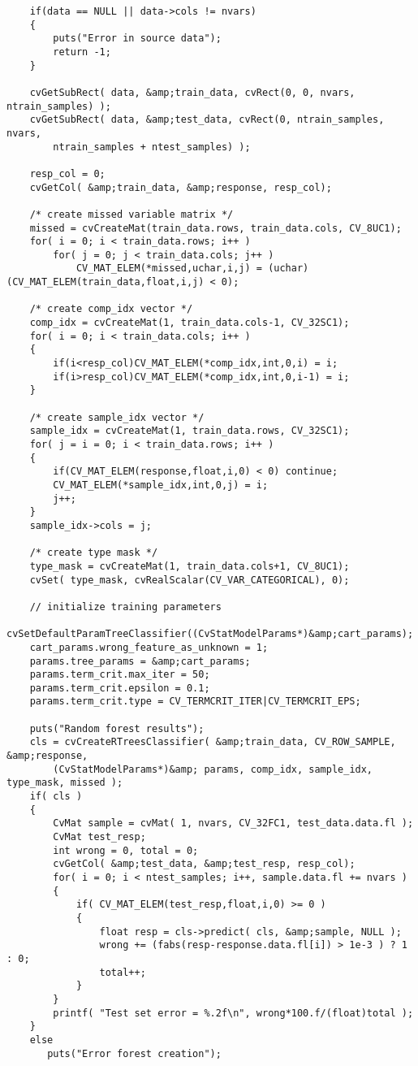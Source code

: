 \begin{verbatim}
    if(data == NULL || data->cols != nvars)
    {
        puts("Error in source data");
        return -1;
    }

    cvGetSubRect( data, &amp;train_data, cvRect(0, 0, nvars, ntrain_samples) );
    cvGetSubRect( data, &amp;test_data, cvRect(0, ntrain_samples, nvars,
        ntrain_samples + ntest_samples) );

    resp_col = 0;
    cvGetCol( &amp;train_data, &amp;response, resp_col);

    /* create missed variable matrix */
    missed = cvCreateMat(train_data.rows, train_data.cols, CV_8UC1);
    for( i = 0; i < train_data.rows; i++ )
        for( j = 0; j < train_data.cols; j++ )
            CV_MAT_ELEM(*missed,uchar,i,j) = (uchar)(CV_MAT_ELEM(train_data,float,i,j) < 0);

    /* create comp_idx vector */
    comp_idx = cvCreateMat(1, train_data.cols-1, CV_32SC1);
    for( i = 0; i < train_data.cols; i++ )
    {
        if(i<resp_col)CV_MAT_ELEM(*comp_idx,int,0,i) = i;
        if(i>resp_col)CV_MAT_ELEM(*comp_idx,int,0,i-1) = i;
    }

    /* create sample_idx vector */
    sample_idx = cvCreateMat(1, train_data.rows, CV_32SC1);
    for( j = i = 0; i < train_data.rows; i++ )
    {
        if(CV_MAT_ELEM(response,float,i,0) < 0) continue;
        CV_MAT_ELEM(*sample_idx,int,0,j) = i;
        j++;
    }
    sample_idx->cols = j;

    /* create type mask */
    type_mask = cvCreateMat(1, train_data.cols+1, CV_8UC1);
    cvSet( type_mask, cvRealScalar(CV_VAR_CATEGORICAL), 0);

    // initialize training parameters
    cvSetDefaultParamTreeClassifier((CvStatModelParams*)&amp;cart_params);
    cart_params.wrong_feature_as_unknown = 1;
    params.tree_params = &amp;cart_params;
    params.term_crit.max_iter = 50;
    params.term_crit.epsilon = 0.1;
    params.term_crit.type = CV_TERMCRIT_ITER|CV_TERMCRIT_EPS;

    puts("Random forest results");
    cls = cvCreateRTreesClassifier( &amp;train_data, CV_ROW_SAMPLE, &amp;response,
        (CvStatModelParams*)&amp; params, comp_idx, sample_idx, type_mask, missed );
    if( cls )
    {
        CvMat sample = cvMat( 1, nvars, CV_32FC1, test_data.data.fl );
        CvMat test_resp;
        int wrong = 0, total = 0;
        cvGetCol( &amp;test_data, &amp;test_resp, resp_col);
        for( i = 0; i < ntest_samples; i++, sample.data.fl += nvars )
        {
            if( CV_MAT_ELEM(test_resp,float,i,0) >= 0 )
            {
                float resp = cls->predict( cls, &amp;sample, NULL );
                wrong += (fabs(resp-response.data.fl[i]) > 1e-3 ) ? 1 : 0;
                total++;
            }
        }
        printf( "Test set error = %.2f\n", wrong*100.f/(float)total );
    }
    else
       puts("Error forest creation");


\end{verbatim}
